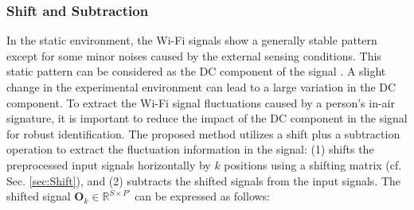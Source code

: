 \subsubsection{Shift and Subtraction}
\label{sec:shift_subtract}
In the static environment, the Wi-Fi signals show a generally stable pattern except for some minor noises caused by the external sensing conditions. This static pattern can be considered as the DC component of the signal \cite{Wang2015}. A slight change in the experimental environment can lead to a large variation in the DC component. To extract the Wi-Fi signal fluctuations caused by a person's in-air signature, it is important to reduce the impact of the DC component in the signal for robust identification. The proposed method utilizes a shift plus a subtraction operation to extract the fluctuation information in the signal: (1) shifts the preprocessed input signals horizontally by $k$ positions using a shifting matrix (cf. Sec. \ref{sec:Shift}), and (2) subtracts the shifted signals from the input signals. The shifted signal $\textbf{O}_{k}\in \mathbb{R}^{S\times P'}$ can be expressed as follows:
